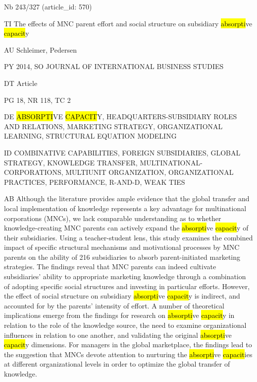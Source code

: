\documentclass[a4paper]{article}
\begin{document}
\vspace*{-2cm}
Nb \tabto{0cm}243/327 (article\_id: 570)\par
TI \tabto{0cm}The effects of MNC parent effort and social structure on subsidiary \hl{absorpti}ve \hl{capacit}y\par
AU \tabto{0cm}Schleimer, Pedersen\par
PY \tabto{0cm}2014, SO JOURNAL OF INTERNATIONAL BUSINESS STUDIES\par
DT \tabto{0cm}Article\par
PG \tabto{0cm}18, NR 118, TC 2\par
DE \tabto{0cm}\hl{ABSORPTI}VE \hl{CAPACIT}Y, HEADQUARTERS-SUBSIDIARY ROLES AND RELATIONS, MARKETING STRATEGY, ORGANIZATIONAL LEARNING, STRUCTURAL EQUATION MODELING\par
ID \tabto{0cm}COMBINATIVE CAPABILITIES, FOREIGN SUBSIDIARIES, GLOBAL STRATEGY, KNOWLEDGE TRANSFER, MULTINATIONAL-CORPORATIONS, MULTIUNIT ORGANIZATION, ORGANIZATIONAL PRACTICES, PERFORMANCE, R-AND-D, WEAK TIES\par
AB \tabto{0cm}Although the literature provides ample evidence that the global transfer and local implementation of knowledge represents a key advantage for multinational corporations (MNCs), we lack comparable understanding as to whether knowledge-creating MNC parents can actively expand the \hl{absorpti}ve \hl{capacit}y of their subsidiaries. Using a teacher-student lens, this study examines the combined impact of specific structural mechanisms and motivational processes by MNC parents on the ability of 216 subsidiaries to absorb parent-initiated marketing strategies. The findings reveal that MNC parents can indeed cultivate subsidiaries' ability to appropriate marketing knowledge through a combination of adopting specific social structures and investing in particular efforts. However, the effect of social structure on subsidiary \hl{absorpti}ve \hl{capacit}y is indirect, and accounted for by the parents' intensity of effort. A number of theoretical implications emerge from the findings for research on \hl{absorpti}ve \hl{capacit}y in relation to the role of the knowledge source, the need to examine organizational influences in relation to one another, and validating the original \hl{absorpti}ve \hl{capacit}y dimensions. For managers in the global marketplace, the findings lead to the suggestion that MNCs devote attention to nurturing the \hl{absorpti}ve \hl{capacit}ies at different organizational levels in order to optimize the global transfer of knowledge.\par
\clearpage
\end{document}
